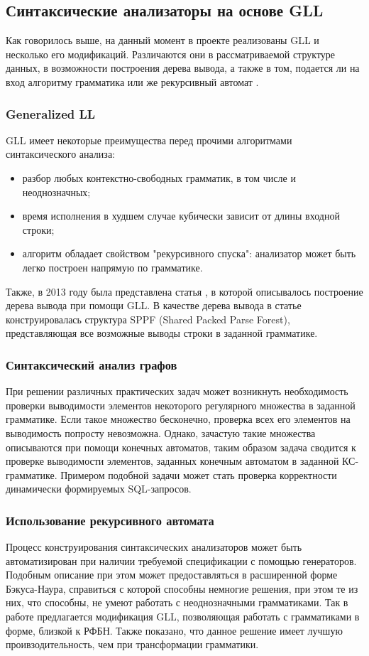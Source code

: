 \documentclass[14pt]{matmex-diploma}
\begin{document}
\subsection{Синтаксические анализаторы на основе GLL}
Как говорилось выше, на данный момент в проекте реализованы GLL и несколько его модификаций. Различаются они в рассматриваемой структуре данных, в возможности построения дерева вывода, а также в том, подается ли на вход алгоритму грамматика или же рекурсивный автомат \cite{RADesc}.

\subsubsection{Generalized LL}
GLL имеет некоторые преимущества перед прочими алгоритмами синтаксического анализа:
\begin{itemize}
    \item разбор любых контекстно-свободных грамматик, в том числе и неоднозначных;
    \item время исполнения в худшем случае кубически зависит от длины входной строки;
    \item алгоритм обладает свойством "рекурсивного спуска": анализатор может быть легко построен напрямую по грамматике.
\end{itemize}
Также, в 2013 году была представлена статья \cite{GLLTreeGen}, в которой описывалось построение дерева вывода при помощи GLL. В качестве дерева вывода в статье конструировалась структура SPPF (Shared Packed Parse Forest), представляющая все возможные выводы строки в заданной грамматике.

\subsubsection{Синтаксический анализ графов}
При решении различных практических задач может возникнуть необходимость проверки выводимости элементов некоторого регулярного множества в заданной грамматике. Если такое множество бесконечно, проверка всех его элементов на выводимость попросту невозможна. Однако, зачастую такие множества описываются при помощи конечных автоматов, таким образом задача сводится к проверке выводимости элементов, заданных конечным автоматом в заданной КС-грамматике. Примером подобной задачи может стать проверка корректности динамически формируемых SQL-запросов.

\subsubsection{Использование рекурсивного автомата}
\label{subsec:ra}
Процесс конструирования синтаксических анализаторов может быть автоматизирован при наличии требуемой спецификации с помощью генераторов. Подобным описание при этом может предоставляться в расширенной форме Бэкуса-Наура, справиться с которой способны немногие решения, при этом те из них, что способны, не умеют работать с неоднозначными грамматиками. Так в работе \cite{paperFSA} предлагается модификация GLL, позволяющая работать с грамматиками в форме, близкой к РФБН. Также показано, что данное решение имеет лучшую проивзодительность, чем при трансформации грамматики.
\end{document}
